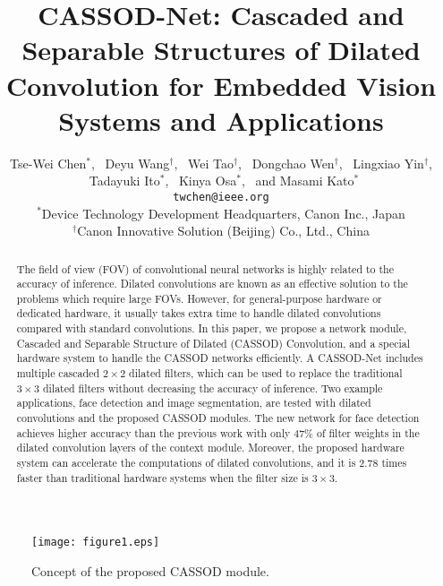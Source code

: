 \documentclass[10pt,twocolumn,letterpaper]{article}
\begin{document}
\title{CASSOD-Net: Cascaded and Separable Structures of Dilated Convolution for Embedded Vision Systems and Applications}
\author{Tse-Wei Chen$^*$,
~Deyu Wang$^\dag$,
~Wei Tao$^\dag$,
~Dongchao Wen$^\dag$,
~Lingxiao Yin$^\dag$,\\
~Tadayuki Ito$^*$,
~Kinya Osa$^*$,
~and Masami Kato$^*$\\
{\tt\small twchen@ieee.org}\\
 $^*$Device Technology Development Headquarters, Canon Inc., Japan\\
 $^\dag$Canon Innovative Solution (Beijing) Co., Ltd., China\\
}





\maketitle
\thispagestyle{empty}

\begin{abstract}
The field of view (FOV) of convolutional neural networks is highly related to the accuracy of inference. Dilated convolutions are known as an effective solution to the problems which require large FOVs. However, for general-purpose hardware or dedicated hardware, it usually takes extra time to handle dilated convolutions compared with standard convolutions. In this paper, we propose a network module, Cascaded and Separable Structure of Dilated (CASSOD) Convolution, and a special hardware system to handle the CASSOD networks efficiently. A CASSOD-Net includes multiple cascaded $2 \times 2$ dilated filters, which can be used to replace the traditional $3 \times 3$ dilated filters without decreasing the accuracy of inference. Two example applications, face detection and image segmentation, are tested with dilated convolutions and the proposed CASSOD modules. The new network for face detection achieves higher accuracy than the previous work with only 47\% of filter weights in the dilated convolution layers of the context module. Moreover, the proposed hardware system can accelerate the computations of dilated convolutions, and it is 2.78 times faster than traditional hardware systems when the filter size is $3 \times 3$.
\end{abstract}



\begin{figure}[h]
\begin{center}
   \texttt{[image: figure1.eps]}
\end{center}
   \caption{Concept of the proposed CASSOD module.}
\label{fig:concept}
\end{figure}
\end{document}
